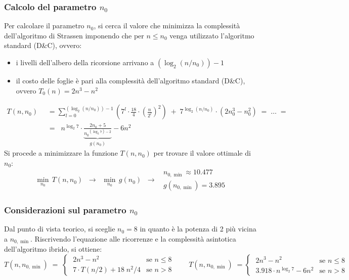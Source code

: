 \subsubsection*{Calcolo del parametro \(n_0\)}
Per calcolare il parametro \(n_0\), si cerca il valore che minimizza la complessità dell'algoritmo di Strassen imponendo
che per \(n \leq n_0\) venga utilizzato l'algoritmo standard (D\&C), ovvero:
\begin{itemize}
	\item i livelli dell'albero della ricorsione arrivano a \((\log_2 (n/n_0)) - 1\)
	\item il costo delle foglie è pari alla complessità dell'algoritmo standard (D\&C), ovvero \(T_0(n) = 2n^3 - n^2\)
\end{itemize}
\begin{align*}
	T(n, n_0) \;\; &= \sum_{l=0}^{(\log_2 (n/n_0)) - 1} \!\! \left( 7^l \cdot \frac{18}{4} \cdot \left( \frac{n}{2^l} \right)^2 \right) \; + \; 7^{\log_2 (n/n_0)} \cdot \left( 2n_0^3 - n_0^2 \right) \; = \; \dots \; = \\[3pt]
	&= \;\; n^{\log_2 7} \cdot \underbrace{\frac{2 n_0 + 5}{{n_0}^{(\log_2 7) - 2}}}_{g(n_0)} - 6n^2
\end{align*}
Si procede a minimizzare la funzione \(T(n, n_0)\) per trovare il valore ottimale di \(n_0\):
\vspace{-5pt}
\[\min_{n_0} \, T(n, n_0) \;\; \longrightarrow \;\; \min_{n_0} \, g(n_0) \;\; \longrightarrow \;\; \begin{array}{l} n_{0, \min} \approx 10.477 \\[3pt] g(n_{0, \min}) = 3.895 \end{array}\]

\subsubsection*{Considerazioni sul parametro \(n_0\)}
Dal punto di vista teorico, si sceglie \(n_0 = 8\) in quanto è la potenza di 2 più vicina a \(n_{0, \min}\). Riscrivendo
l'equazione alle ricorrenze e la complessità asintotica dell'algoritmo ibrido, si ottiene:
\[T(n, n_{0, \min}) \; = \; \begin{cases}
	\; 2n^3 - n^2 & \text{se } n \leq 8 \\[3pt]
	\; 7 \cdot T(n/2) + 18 \; n^2/4 & \text{se } n > 8
\end{cases} \qquad T(n, n_{0, \min}) \; = \begin{cases}
	\; 2n^3 - n^2 & \text{se } n \leq 8 \\[3pt]
	\; 3.918 \cdot n^{\log_2 7} - 6n^2 & \text{se } n > 8
\end{cases}\]

